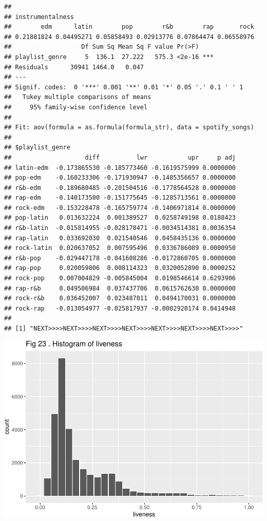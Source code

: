 \documentclass[
]{article}
\begin{document}
\begin{verbatim}
## 
## instrumentalness
##        edm      latin        pop        r&b        rap       rock 
## 0.21881824 0.04495271 0.05858493 0.02913776 0.07864474 0.06558976 
##                   Df Sum Sq Mean Sq F value Pr(>F)    
## playlist_genre     5  136.1  27.222   575.3 <2e-16 ***
## Residuals      30941 1464.0   0.047                   
## ---
## Signif. codes:  0 '***' 0.001 '**' 0.01 '*' 0.05 '.' 0.1 ' ' 1
##   Tukey multiple comparisons of means
##     95% family-wise confidence level
## 
## Fit: aov(formula = as.formula(formula_str), data = spotify_songs)
## 
## $playlist_genre
##                    diff          lwr           upr     p adj
## latin-edm  -0.173865530 -0.185773460 -0.1619575999 0.0000000
## pop-edm    -0.160233306 -0.171930947 -0.1485356657 0.0000000
## r&b-edm    -0.189680485 -0.201504516 -0.1778564528 0.0000000
## rap-edm    -0.140173500 -0.151775645 -0.1285713561 0.0000000
## rock-edm   -0.153228478 -0.165759774 -0.1406971814 0.0000000
## pop-latin   0.013632224  0.001389527  0.0258749198 0.0188423
## r&b-latin  -0.015814955 -0.028178471 -0.0034514381 0.0036354
## rap-latin   0.033692030  0.021540546  0.0458435136 0.0000000
## rock-latin  0.020637052  0.007595496  0.0336786089 0.0000950
## r&b-pop    -0.029447178 -0.041608286 -0.0172860705 0.0000000
## rap-pop     0.020059806  0.008114323  0.0320052890 0.0000252
## rock-pop    0.007004829 -0.005845004  0.0198546614 0.6293906
## rap-r&b     0.049506984  0.037437706  0.0615762630 0.0000000
## rock-r&b    0.036452007  0.023487011  0.0494170031 0.0000000
## rock-rap   -0.013054977 -0.025817937 -0.0002920174 0.0414948
## 
## [1] "NEXT>>>>NEXT>>>>NEXT>>>>NEXT>>>>NEXT>>>>NEXT>>>>NEXT>>>>"
\end{verbatim}

\includegraphics{Final-Report_files/figure-latex/unnamed-chunk-14-19.pdf}
\end{document}

